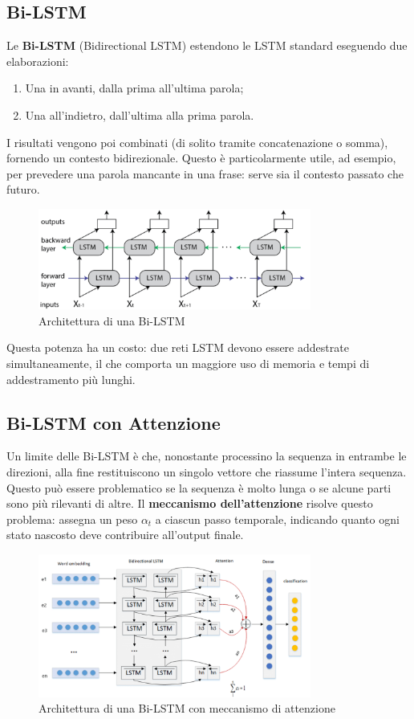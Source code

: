 \subsection{Bi-LSTM}
Le \textbf{Bi-LSTM} (Bidirectional LSTM) estendono le LSTM standard eseguendo due elaborazioni:
\begin{enumerate}
    \item Una in avanti, dalla prima all'ultima parola;
    \item Una all’indietro, dall’ultima alla prima parola.
\end{enumerate}
I risultati vengono poi combinati (di solito tramite concatenazione o somma), fornendo un contesto bidirezionale. Questo è particolarmente utile, ad esempio, per prevedere una parola mancante in una frase: serve sia il contesto passato che futuro.
\begin{figure}
    \centering
    \includegraphics[width=0.8\textwidth]{figure/Bi-LSTM.png}
    \caption{Architettura di una Bi-LSTM}
    \label{fig:bilstm}
\end{figure}
Questa potenza ha un costo: due reti LSTM devono essere addestrate simultaneamente, il che comporta un maggiore uso di memoria e tempi di addestramento più lunghi.

\subsection{Bi-LSTM con Attenzione}
Un limite delle Bi-LSTM è che, nonostante processino la sequenza in entrambe le direzioni, alla fine restituiscono un singolo vettore che riassume l'intera sequenza. Questo può essere problematico se la sequenza è molto lunga o se alcune parti sono più rilevanti di altre. Il \textbf{meccanismo dell'attenzione} risolve questo problema: assegna un peso $\alpha_t$ a ciascun passo temporale, indicando quanto ogni stato nascosto deve contribuire all'output finale.

\begin{figure}[hbtp]
    \centering
    \includegraphics[width=0.8\textwidth]{figure/Bi-LSTMAtt.png}
    \caption{Architettura di una Bi-LSTM con meccanismo di attenzione}
    \label{fig:bilstmatt}
\end{figure}